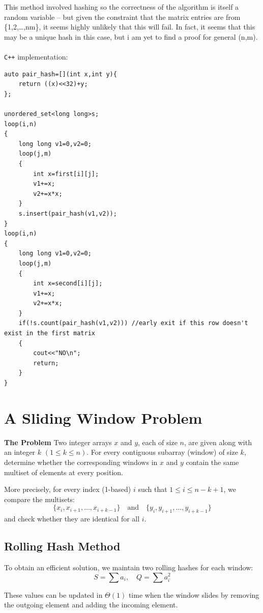 \documentclass[11pt,openany]{book}
\begin{document}
This method involved hashing so the correctness of the algorithm is itself a random variable -- but given the constraint that
the matrix entries are from \{1,2,\dots,nm\}, it seems highly unlikely that this will fail.
In fact, it seems that this may be a unique hash in this case, but i am yet to find a proof for general (n,m).\\\\
\noindent \texttt{C++} implementation:
\begin{verbatim}
auto pair_hash=[](int x,int y){
    return ((x)<<32)+y;
};

unordered_set<long long>s;
loop(i,n)
{
    long long v1=0,v2=0;
    loop(j,m)
    {
        int x=first[i][j];
        v1+=x;
        v2+=x*x;
    }
    s.insert(pair_hash(v1,v2));
}
loop(i,n)
{
    long long v1=0,v2=0;
    loop(j,m)
    {
        int x=second[i][j];
        v1+=x;
        v2+=x*x;
    }
    if(!s.count(pair_hash(v1,v2))) //early exit if this row doesn't exist in the first matrix
    {
        cout<<"NO\n";
        return;
    }          
}
\end{verbatim}

\section{A Sliding Window Problem}

\textbf{The Problem} Two integer arrays $x$ and $y$, each of size $n$, are given along with an integer $k$ $(1 \le k \le n)$. For every contiguous subarray (window) of size $k$, determine whether the corresponding windows in $x$ and $y$ contain the same multiset of elements at every position.

More precisely, for every index (1-based) $i$ such that $1 \le i \le n-k+1$, we compare the multisets:
\[
\{x_i, x_{i+1}, \dots, x_{i+k-1}\} \quad \text{and} \quad \{y_i, y_{i+1}, \dots, y_{i+k-1}\}
\]
and check whether they are identical for all $i$.

\subsection*{Rolling Hash Method}

To obtain an efficient solution, we maintain two rolling hashes for each window:
\[
S = \sum a_i, \quad Q = \sum a_i^2
\]

These values can be updated in $\Theta(1)$ time when the window slides by removing the outgoing element and adding the incoming element.
\end{document}
